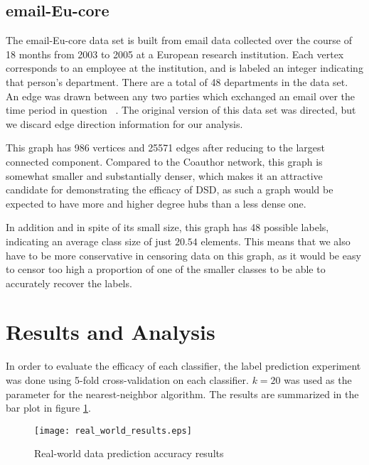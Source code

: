 \subsection{email-Eu-core}

The email-Eu-core data set is built from email data collected over the course of 18 months from 2003
to 2005 at a European research institution. Each vertex corresponds to an employee at the
institution, and is labeled an integer indicating that person's department. There are a total of 48
departments in the data set. An edge was drawn between any two parties which exchanged an email over
the time period in question ~\cite{snapnets}. The original version of this data set was directed,
but we discard edge direction information for our analysis.

This graph has 986 vertices and 25571 edges after reducing to the largest connected component.
Compared to the Coauthor network, this graph is somewhat smaller and substantially denser, which
makes it an attractive candidate for demonstrating the efficacy of DSD, as such a graph would be
expected to have more and higher degree hubs than a less dense one.

In addition and in spite of its small size, this graph has 48 possible labels, indicating an average
class size of just $20.54$ elements. This means that we also have to be more conservative in
censoring data on this graph, as it would be easy to censor too high a proportion of one of the
smaller classes to be able to accurately recover the labels.


\section{Results and Analysis}

In order to evaluate the efficacy of each classifier, the label prediction experiment was done using
5-fold cross-validation on each classifier. $k=20$ was used as the parameter for the
nearest-neighbor algorithm. The results are summarized in the bar plot in figure
\ref{fig:real_world_results}.

\begin{figure}[H]
  \centering
  \texttt{[image: real\_world\_results.eps]}
  \caption{Real-world data prediction accuracy results}
  \label{fig:real_world_results}
\end{figure}


